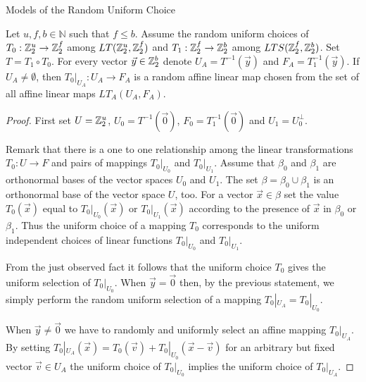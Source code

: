 \begin{section}{Models of the Random Uniform Choice}
\begin{remark}
\label{remark-model-uniform-linear-map-selection-affine}
Let $u, f, b \in \mathbb{N}$ such that $f \leq b$. Assume the random uniform choices of $T_0:\mathbb{Z}_{2}^{u} \rightarrow \mathbb{Z}_{2}^{f}$ among $LT(\mathbb{Z}_{2}^{u}, \mathbb{Z}_{2}^{f})$ and $T_1: \mathbb{Z}_{2}^{f} \rightarrow \mathbb{Z}_{2}^{b}$ among $LTS(\mathbb{Z}_{2}^{f}, \mathbb{Z}_{2}^{b})$. Set $T = T_1 \circ T_0$. For every vector $\vec{y} \in \mathbb{Z}_{2}^{b}$ denote $U_A = T ^ {-1}(\vec{y})$ and $F_A = T_1 ^ {-1}(\vec{y})$. If $U_A \neq \emptyset$, then $T_0|_{U_A}: U_A \rightarrow F_A$ is a random affine linear map chosen from the set of all affine linear maps $LT_{A}(U_A, F_A)$.
\end{remark}
\begin{proof}
First set $U = \mathbb{Z}_{2}^{u}$, $U_0 = T^{-1}(\vec{0})$, $F_0 = T_1^{-1}(\vec{0})$ and $U_1 = U_0 ^ {\bot}$. 

Remark that there is a one to one relationship among the linear transformations $T_0: U \rightarrow F$ and pairs of mappings $T_0|_{U_0}$ and $T_0|_{U_1}$. Assume that $\beta_0$ and $\beta_1$ are orthonormal bases of the vector spaces $U_0$ and $U_1$. The set $\beta = \beta_0 \cup \beta_1$ is an orthonormal base of the vector space $U$, too. For a vector $\vec{x} \in \beta$ set the value $T_0(\vec{x})$ equal to $T_0|_{U_0}(\vec{x})$ or $T_0|_{U_1}(\vec{x})$ according to the presence of $\vec{x}$ in $\beta_0$ or $\beta_1$. Thus the uniform choice of a mapping $T_0$ corresponds to the uniform independent choices of linear functions $T_0|_{U_0}$ and $T_0|_{U_1}$.

From the just observed fact it follows that the uniform choice $T_0$ gives the uniform selection of $T_0|_{U_0}$.  When $\vec{y} = \vec{0}$ then, by the previous statement, we simply perform the random uniform selection of a mapping $T_0|_{U_A} = T_0|_{U_0}$. 

When $\vec{y} \neq \vec{0}$ we have to randomly and uniformly select an affine mapping $T_0|_{U_A}$. By setting $T_0|_{U_A}(\vec{x}) = T_0(\vec{v}) + T_0|_{U_0}(\vec{x} - \vec{v})$ for an arbitrary but fixed vector $\vec{v} \in U_A$ the uniform choice of $T_0|_{U_0}$ implies the uniform choice of $T_0|_{U_A}$.
\end{proof}
\end{section}
